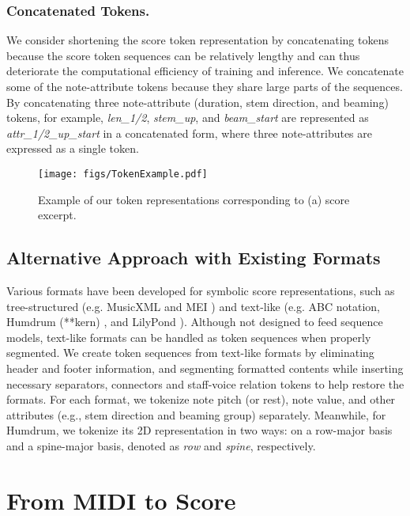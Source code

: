 \documentclass[sigconf]{acmart} %
\begin{document}
\subsubsection{Concatenated Tokens.}
\label{sec:concat}
We consider shortening the score token representation by concatenating tokens because the score token sequences can be relatively lengthy and can thus deteriorate the computational efficiency of training and inference. We concatenate some of the note-attribute tokens because they share large parts of the sequences. By concatenating three note-attribute (duration, stem direction, and beaming) tokens, for example, \textit{len\_1/2}, \textit{stem\_up}, and \textit{beam\_start} are represented as \textit{attr\_1/2\_up\_start} in a concatenated form, where three note-attributes are expressed as a single token.

\begin{figure}[h]
 \centerline{
 \texttt{[image: figs/TokenExample.pdf]}}
 \caption{Example of our token representations corresponding to (a) score excerpt. }
 \label{fig:token_example}
\end{figure}

\subsection{Alternative Approach with Existing Formats}
\label{sec:alternative}
Various formats have been developed for symbolic score representations, such as tree-structured (e.g. MusicXML \cite{Good2003} and MEI \cite{Hankinson2011}) and text-like (e.g. ABC notation, Humdrum (**kern) \cite{Huron2002}, and LilyPond \cite{Nienhuys2003}). Although not designed to feed sequence models, text-like formats can be handled as token sequences when properly segmented. We create token sequences from text-like formats by eliminating header and footer information, and segmenting formatted contents while inserting necessary separators, connectors and staff-voice relation tokens to help restore the formats. For each format, we tokenize note pitch (or rest), note value, and other attributes (e.g., stem direction and beaming group) separately. Meanwhile, for Humdrum, we tokenize its 2D representation in two ways: on a row-major basis and a spine-major basis, denoted as \textit{row} and \textit{spine}, respectively.

\section{From MIDI to Score}
\label{sec:4}
\end{document}
